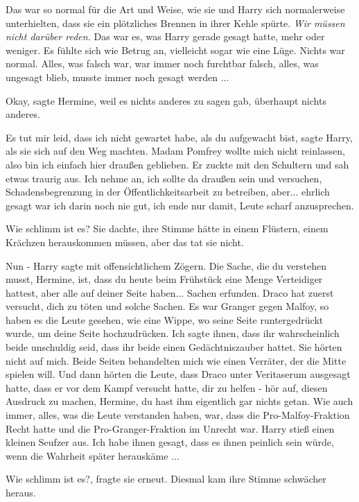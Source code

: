 Das war so normal für die Art und Weise, wie sie und Harry sich normalerweise
unterhielten, dass sie ein plötzliches Brennen in ihrer Kehle spürte. \emph{Wir
müssen nicht darüber reden.} Das war es, was Harry gerade gesagt hatte, mehr
oder weniger. Es fühlte sich wie Betrug an, vielleicht sogar wie eine Lüge.
Nichts war normal. Alles, was falsch war, war immer noch furchtbar falsch,
alles, was ungesagt blieb, musste immer noch gesagt werden ...

\glqq Okay\grqq{}, sagte Hermine, weil es nichts anderes zu sagen gab, überhaupt
nichts anderes.

\glqq Es tut mir leid, dass ich nicht gewartet habe, als du aufgewacht
bist\grqq{}, sagte Harry, als sie sich auf den Weg machten. \glqq Madam Pomfrey
wollte mich nicht reinlassen, also bin ich einfach hier draußen
geblieben.\grqq{} Er zuckte mit den Schultern und sah etwas traurig aus. \glqq
Ich nehme an, ich sollte da draußen sein und versuchen, Schadensbegrenzung in
der Öffentlichkeitsarbeit zu betreiben, aber... ehrlich gesagt war ich darin
noch nie gut, ich ende nur damit, Leute scharf anzusprechen.\grqq{}

\glqq Wie schlimm ist es?\grqq{} Sie dachte, ihre Stimme hätte in einem
Flüstern, einem Krächzen herauskommen müssen, aber das tat sie nicht.

\glqq Nun -\grqq{} Harry sagte mit offensichtlichem Zögern. \glqq Die Sache, die
du verstehen musst, Hermine, ist, dass du heute beim Frühstück eine Menge
Verteidiger hattest, aber alle auf deiner Seite haben... Sachen erfunden. Draco
hat zuerst versucht, dich zu töten und solche Sachen. Es war Granger gegen
Malfoy, so haben es die Leute gesehen, wie eine Wippe, wo seine Seite
runtergedrückt wurde, um deine Seite hochzudrücken. Ich sagte ihnen, dass ihr
wahrscheinlich beide unschuldig seid, dass ihr beide einen Gedächtniszauber
hattet. Sie hörten nicht auf mich. Beide Seiten behandelten mich wie einen
Verräter, der die Mitte spielen will. Und dann hörten die Leute, dass Draco
unter Veritaserum ausgesagt hatte, dass er vor dem Kampf versucht hatte, dir zu
helfen - hör auf, diesen Ausdruck zu machen, Hermine, du hast ihm eigentlich gar
nichts getan. Wie auch immer, alles, was die Leute verstanden haben, war, dass
die Pro-Malfoy-Fraktion Recht hatte und die Pro-Granger-Fraktion im Unrecht
war.\grqq{} Harry stieß einen kleinen Seufzer aus. \glqq Ich habe ihnen gesagt,
dass es ihnen peinlich sein würde, wenn die Wahrheit später herauskäme
...\grqq{}

\glqq Wie schlimm ist es?\grqq{}, fragte sie erneut. Diesmal kam ihre Stimme
schwächer heraus.

